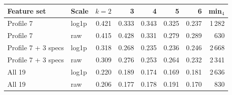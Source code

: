 \begin{tabular}{@{}llrrrrrr@{}}
\toprule
Feature set & Scale & $k{=}2$ & 3 & 4 & 5 & 6 & min$_{4}$ \\
\midrule
Profile 7 & log1p & 0.421 & 0.333 & 0.343 & 0.325 & 0.237 & 1\,282 \\
Profile 7 & raw & 0.415 & 0.428 & 0.331 & 0.279 & 0.289 & 630 \\
\midrule
Profile 7 + 3 specs & log1p & 0.318 & 0.268 & 0.235 & 0.236 & 0.246 & 2\,668 \\
Profile 7 + 3 specs & raw & 0.309 & 0.276 & 0.253 & 0.264 & 0.232 & 2\,341 \\
\midrule
All 19 & log1p & 0.220 & 0.189 & 0.174 & 0.169 & 0.181 & 2\,636 \\
All 19 & raw & 0.206 & 0.177 & 0.178 & 0.191 & 0.170 & 830 \\
\bottomrule
\end{tabular}
